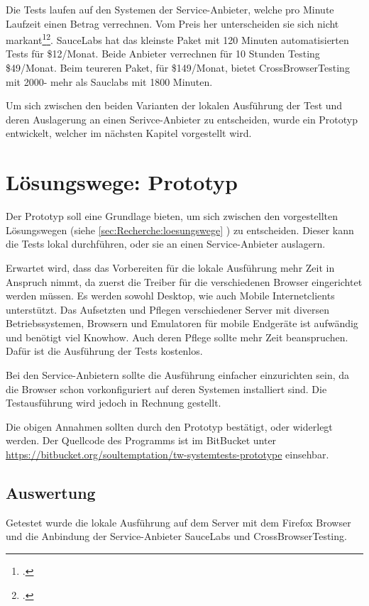 Die Tests laufen auf den Systemen der Service-Anbieter, welche pro Minute Laufzeit einen Betrag verrechnen. Vom Preis her unterscheiden sie sich nicht markant\footcite{Sauce_Labs_Pricing_2015-07-26}\footcite{Test_your_site_on_all_browsers_2015-07-26}. SauceLabs hat das kleinste Paket mit 120 Minuten automatisierten Tests für \$12/Monat. Beide Anbieter verrechnen für 10 Stunden Testing \$49/Monat. Beim teureren Paket, für \$149/Monat, bietet CrossBrowserTesting mit 2000- mehr als Sauclabs mit 1800 Minuten.

Um sich zwischen den beiden Varianten der lokalen Ausführung der Test und deren Auslagerung an einen Serivce-Anbieter zu entscheiden, wurde ein Prototyp entwickelt, welcher im nächsten Kapitel vorgestellt wird.

\section{Lösungswege: Prototyp}
Der Prototyp soll eine Grundlage bieten, um sich zwischen den vorgestellten Lösungswegen (siehe \cref{sec:Recherche:loesungswege} ) zu entscheiden. Dieser kann die Tests lokal durchführen, oder sie an einen Service-Anbieter auslagern.

Erwartet wird, dass das Vorbereiten für die lokale Ausführung mehr Zeit in Anspruch nimmt, da zuerst die Treiber für die verschiedenen Browser eingerichtet werden müssen. Es werden sowohl Desktop, wie auch Mobile Internetclients unterstützt. Das Aufsetzten und Pflegen verschiedener Server mit diversen Betriebssystemen, Browsern und Emulatoren für mobile Endgeräte ist aufwändig und benötigt viel Knowhow. Auch deren Pflege sollte mehr Zeit beanspruchen. Dafür ist die Ausführung der Tests kostenlos.

Bei den Service-Anbietern sollte die Ausführung einfacher einzurichten sein, da die Browser schon vorkonfiguriert auf deren Systemen installiert sind. Die Testausführung wird jedoch in Rechnung gestellt. 

Die obigen Annahmen sollten durch den Prototyp bestätigt, oder widerlegt werden. Der Quellcode des Programms ist im BitBucket unter \url{https://bitbucket.org/soultemptation/tw-systemtests-prototype} einsehbar.

\subsection{Auswertung}
Getestet wurde die lokale Ausführung auf dem Server mit dem Firefox Browser und die Anbindung der Service-Anbieter SauceLabs und CrossBrowserTesting. 

